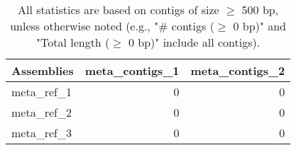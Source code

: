 \documentclass[12pt,a4paper]{article}
\begin{document}
\begin{table}[ht]
\begin{center}
\caption{All statistics are based on contigs of size $\geq$ 500 bp, unless otherwise noted (e.g., "\# contigs ($\geq$ 0 bp)" and "Total length ($\geq$ 0 bp)" include all contigs).}
\begin{tabular}{|l*{2}{|r}|}
\hline
Assemblies & meta\_contigs\_1 & meta\_contigs\_2 \\ \hline
meta\_ref\_1 & 0 & 0 \\ \hline
meta\_ref\_2 & 0 & 0 \\ \hline
meta\_ref\_3 & 0 & 0 \\ \hline
\end{tabular}
\end{center}
\end{table}
\end{document}
